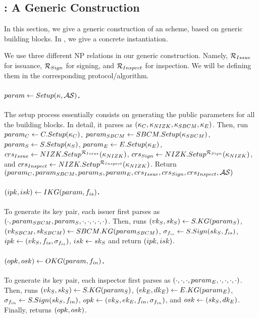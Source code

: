 \subsection{\CUASGen: A Generic \UAS Construction}
\label{ssec:generic-construction-uas}

In this section, we give a generic construction of an \UAS scheme, based on
generic building blocks. In , we give a concrete
instantiation.

We use three different NP relations in our generic construction. Namely,
$\mathcal{R}_{Issue}$ for issuance, $\mathcal{R}_{Sign}$ for signing, and
$\mathcal{R}_{Inspect}$ for inspection. We will be defining them in the
corresponding protocol/algorithm.


\paragraph{$param \gets Setup(\kappa,\mathcal{AS})$.} %
The setup process essentially consists on generating the public parameters
for all the building blocks. In detail, it parses \secpar as $(\kappa_{C},
\kappa_{NIZK},\kappa_{SBCM},\kappa_{E})$. Then, run $param_C \gets
C.Setup(\kappa_{C})$, $param_{SBCM} \gets  SBCM.Setup(\kappa_{SBCM})$, $param_{S} \gets
S.Setup(\kappa_{S})$, $param_{E} \gets E.Setup(\kappa_{E})$, $crs_{Issue} \gets
NIZK.Setup^{\mathcal{R}_{Issue}}(\kappa_{NIZK})$, $crs_{Sign} \gets
NIZK.Setup^{\mathcal{R}_{Sign}}(\kappa_{NIZK})$, and $crs_{Inspect} \gets
NIZK.Setup^{\mathcal{R}_{Inspect}}(\kappa_{NIZK})$. Return $(param_C,param_{SBCM},
param_{S},param_{E},crs_{Issue},crs_{Sign},crs_{Inspect},
\mathcal{AS})$

\paragraph{$(ipk,isk) \gets IKG(param,f_{is})$.} %
To generate its key pair, each issuer first parses \parm as $(\cdot,param_{SBCM},
param_{S},\cdot,\cdot,\cdot,\cdot,\cdot)$. Then, runs $(vk_{S},sk_{S}) \gets
S.KG(param_{S})$, $(vk_{SBCM},sk_{SBCM}) \gets SBCM.KG(param_{SBCM})$,
$\sigma_{f_{is}} \gets S.Sign(sk_{S},f_{is})$, $ipk \gets (vk_{S},f_{is},
\sigma_{f_{is}})$, $isk \gets sk_{S}$ and return $(ipk,isk)$.

\paragraph{$(opk,osk) \gets OKG(param,f_{in})$.} %
To generate its key pair, each inspector first parses \parm as $(\cdot,\cdot,
\cdot,param_{E},\cdot,\cdot,\cdot,\cdot)$. Then, runs $(vk_{S},sk_{S}) \gets S.KG
(param_{S})$, $(ek_{E},dk_{E}) \gets E.KG(param_{E})$, $\sigma_{f_{in}} \gets S.Sign
(sk_{S},f_{in})$, $opk \gets (vk_{S},ek_{E},f_{in},\sigma_{f_{in}})$, and $osk \gets
(sk_{S},dk_{E})$. Finally, returns $(opk,osk)$.


